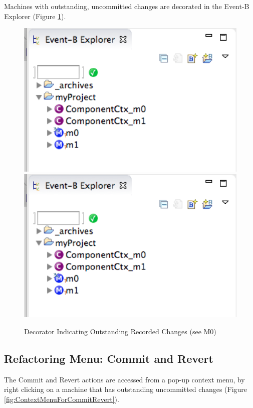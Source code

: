 Machines with outstanding, uncommitted changes are decorated in the Event-B Explorer (Figure \ref{fig:DecoratorIndicatingOutstandingRecordedChanges}). 

 \begin{figure}[!htbp]
  \centering
  \ifplastex
  \includegraphics[width=1024]{figures/image60.png}
  \else
  \includegraphics[width=1\textwidth]{figures/image60.png}
  \fi
  \caption{Decorator Indicating Outstanding Recorded Changes (see M0)}
  \label{fig:DecoratorIndicatingOutstandingRecordedChanges}
\end{figure} 

\subsection{Refactoring Menu: Commit and Revert}

The Commit and Revert actions are accessed from a pop-up context menu, by right clicking on a machine that has outstanding uncommitted changes (Figure \ref{fig:ContextMenuForCommitRevert}).

